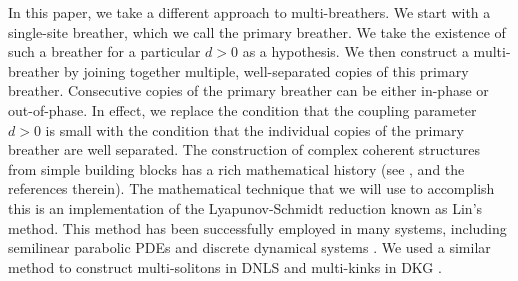 \documentclass[12pt,reqno]{amsart}
\theoremstyle{definition}
\begin{document}
In this paper, we take a different approach to multi-breathers. We start with a single-site breather, which we call the primary breather. We take the existence of such a breather for a particular $d>0$ as a hypothesis. We then construct a multi-breather by joining together multiple, well-separated copies of this primary breather. Consecutive copies of the primary breather can be either in-phase or out-of-phase. In effect, we replace the condition that the coupling parameter $d>0$ is small with the condition that the individual copies of the primary breather are well separated. 
The construction of complex coherent structures from simple building blocks has a rich mathematical history (see \cite{Sandstede1998}, and the references therein). The mathematical technique that we will use to accomplish this is an implementation of the Lyapunov-Schmidt reduction known as Lin's method. This method has been successfully employed in many systems, including semilinear parabolic PDEs \cites{Sandstede1998,doi:10.1137/0150029} and discrete dynamical systems \cite{Knobloch2000}. We used a similar method to construct multi-solitons in DNLS \cite{Parker2020} and multi-kinks in DKG \cite{Parker2021}. 
\end{document}
